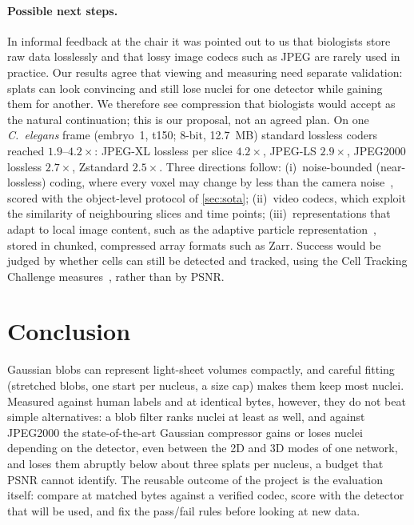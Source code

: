 \documentclass[
  paper=a4,
  fontsize=11pt,
  english,
  numbers=noenddot,
  parskip=half,
  cdgeometry=symmetric,
  cd=barcolor,
  cdfont=false
]{tudscrartcl}
\begin{document}
\paragraph{Possible next steps.} In informal feedback at the chair it was pointed out to us that
biologists store raw data losslessly and that lossy image codecs such as JPEG are rarely used
in practice. Our results agree that viewing and measuring need separate validation: splats
can look convincing and still lose nuclei for one detector while gaining them for another. We
therefore see compression that biologists would accept as the natural continuation; this is our
proposal, not an agreed plan. On one \emph{C.~elegans}
frame (embryo~1, t150; 8-bit, \SI{12.7}{MB}) standard
lossless coders reached $1.9$--$4.2\times$: JPEG-XL lossless per slice $4.2\times$, JPEG-LS
$2.9\times$, JPEG2000 lossless $2.7\times$, Zstandard $2.5\times$. Three directions follow:
(i)~noise-bounded (near-lossless) coding, where every voxel may change by less than the camera
noise~\cite{balazs2017b3d}, scored with the object-level protocol of \cref{sec:sota};
(ii)~video codecs, which exploit the similarity of neighbouring slices and time points;
(iii)~representations that adapt to local image content, such as the adaptive particle
representation~\cite{cheeseman2018adaptive}, stored in chunked, compressed array formats such as
Zarr. Success would be judged by whether cells can still be detected and tracked, using the
Cell Tracking Challenge measures~\cite{maska2023cell}, rather than by PSNR.

\section{Conclusion}\label{sec:conclusion}

Gaussian blobs can represent light-sheet volumes compactly, and careful fitting (stretched
blobs, one start per nucleus, a size cap) makes them keep most nuclei. Measured against human
labels and at identical bytes, however, they do not beat simple alternatives: a blob filter
ranks nuclei at least as well, and against JPEG2000 the state-of-the-art Gaussian compressor gains or loses
nuclei depending on the detector, even between the 2D and 3D modes of one network, and loses
them abruptly below about three splats per nucleus, a budget that PSNR cannot identify. The
reusable outcome of the project is the evaluation itself: compare at matched bytes against a
verified codec, score with the detector that will be used, and fix the pass/fail rules before
looking at new data.

\printbibliography[heading=bibintoc]

\clearpage
\appendix

\end{document}
